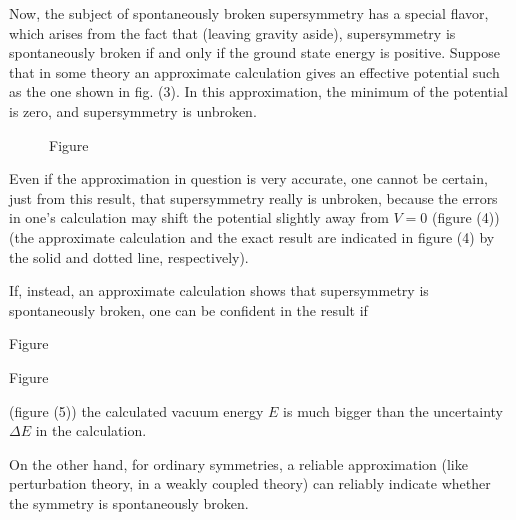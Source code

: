 \documentclass[11pt,a4paper]{article}
\begin{document}
Now, the subject of spontaneously broken supersymmetry has a
special flavor, which arises from the fact that (leaving gravity
aside), supersymmetry is spontaneously broken if and only if the
ground state energy is positive. Suppose that in some theory an approximate
calculation gives an effective potential such as the one
shown in fig. (3). In this approximation, the minimum of the potential
is zero, and supersymmetry is unbroken.

\begin{figure}
\vspace{-0.5\baselineskip}
\centering

\par\smallskip
Figure~\thefigure
\vspace{-0.9\baselineskip}
\end{figure}

Even if the approximation in question is very accurate, one
cannot be certain, just from this result, that supersymmetry really
is unbroken, because the errors in one's calculation may shift the
potential slightly away from $V = 0$ (figure (4)) (the approximate
calculation and the exact result are indicated in figure (4) by the
solid and dotted line, respectively).

If, instead, an approximate calculation shows that supersymmetry
is spontaneously broken, one can be confident in the result if

\begin{center}
\begin{minipage}{0.42\textwidth}
\centering
{}

\par\smallskip
Figure~\thefigure
\end{minipage}\hfill
\begin{minipage}{0.42\textwidth}
\centering
{}

\par\smallskip
Figure~\thefigure
\end{minipage}
\end{center}

(figure (5)) the calculated vacuum energy $E$ is much bigger than the
uncertainty $\Delta E$ in the calculation.

On the other hand, for ordinary symmetries, a reliable approximation
(like perturbation theory, in a weakly coupled theory) can
reliably indicate whether the symmetry is spontaneously broken.
\end{document}

